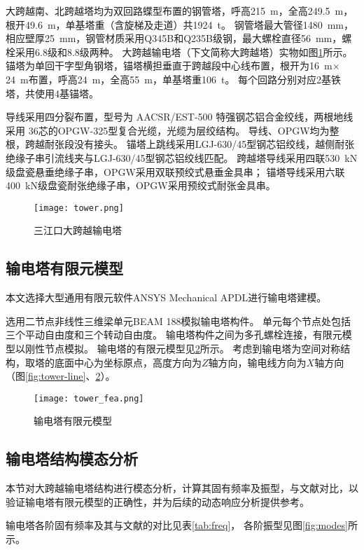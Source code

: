 大跨越南、北跨越塔均为双回路蝶型布置的钢管塔，呼高\SI{215}{m}，全高\SI{249.5}{m}，根开\SI{49.6}{m}，单基塔重（含旋梯及走道）共\SI{1924}{t}。
钢管塔最大管径\SI{1480}{mm}，相应壁厚\SI{25}{mm}，钢管材质采用Q345B和Q235B级钢，最大螺栓直径\SI{56}{mm}，螺栓采用6.8级和8.8级两种。
大跨越输电塔（下文简称大跨越塔）实物如图\ref{fig:real-tower}所示。
锚塔为单回干字型角钢塔，锚塔横担垂直于跨越段中心线布置，根开为\SI{16}{m}$\times$\SI{24}{m}布置，呼高\SI{24}{m}，全高\SI{55}{m}，单基塔重\SI{106}{t}。
每个回路分别对应2基铁塔，共使用4基锚塔。

导线采用四分裂布置，型号为 AACSR/EST-500 特强钢芯铝合金绞线，两根地线采用 36芯的OPGW-325型复合光缆，光缆为层绞结构。
导线、OPGW均为整根，跨越耐张段没有接头。
锚塔上跳线采用LGJ-630/45型钢芯铝绞线，越侧耐张绝缘子串引流线夹与LGJ-630/45型钢芯铝绞线匹配。
跨越塔导线采用四联\SI{530}{kN}级盘瓷悬垂绝缘子串，OPGW采用双联预绞式悬垂金具串；
锚塔导线采用六联\SI{400}{kN}级盘瓷耐张绝缘子串，OPGW采用预绞式耐张金具串。
\begin{figure}[!htbp]
	\centering
	\texttt{[image: tower.png]}
	\caption{三江口大跨越输电塔}
	\label{fig:real-tower}
\end{figure}

\subsection{输电塔有限元模型}\label{sec:tower-fea}
本文选择大型通用有限元软件ANSYS Mechanical APDL进行输电塔建模。

选用二节点非线性三维梁单元BEAM 188模拟输电塔构件。
单元每个节点处包括三个平动自由度和三个转动自由度。
输电塔构件之间为多孔螺栓连接，有限元模型以刚性节点模拟。
输电塔的有限元模型见\ref{fig:tower-fea}所示。
考虑到输电塔为空间对称结构，取塔的底面中心为坐标原点，高度方向为$Z$轴方向，输电线方向为$X$轴方向（图\ref{fig:tower-line}、\ref{fig:tower-fea}）。
\begin{figure}[!htbp]
	\centering
	\texttt{[image: tower\_fea.png]}
	\caption{输电塔有限元模型}
	\label{fig:tower-fea}
\end{figure}

\subsection{输电塔结构模态分析}
本节对大跨越输电塔结构进行模态分析，计算其固有频率及振型，与文献对比，以验证输电塔有限元模型的正确性，并为后续的动态响应分析提供参考。

输电塔各阶固有频率及其与文献\cite{ren2010tower}的对比见表\ref{tab:freq}，
各阶振型见图\ref{fig:modes}所示。

